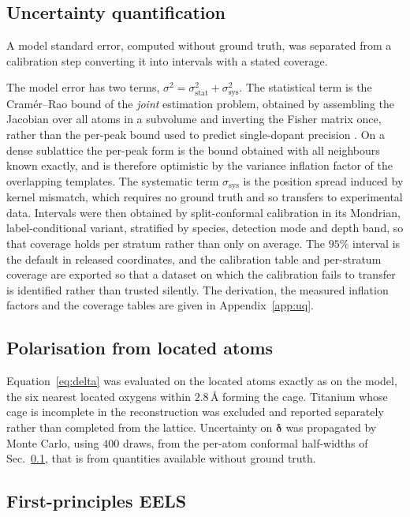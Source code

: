 \documentclass[aps,prb,twocolumn,superscriptaddress,floatfix,nofootinbib]{revtex4-2}
\begin{document}
\subsection{Uncertainty quantification}
\label{sec:uq}

A model standard error, computed without ground truth, was separated from a calibration step
converting it into intervals with a stated coverage.

The model error has two terms, $\sigma^2=\sigma^2_{\mathrm{stat}}+\sigma^2_{\mathrm{sys}}$. The
statistical term is the Cram\'er--Rao bound of the \emph{joint} estimation problem, obtained by
assembling the Jacobian over all atoms in a subvolume and inverting the Fisher matrix once,
rather than the per-peak bound used to predict single-dopant precision
\citep{Chen2021}. On a dense sublattice the per-peak form is the bound obtained
with all neighbours known exactly, and is therefore optimistic by the variance inflation factor
of the overlapping templates. The systematic term $\sigma_{\mathrm{sys}}$ is the position spread
induced by kernel mismatch, which requires no ground truth and so transfers to experimental
data. Intervals were then obtained by split-conformal calibration
\citep{Vovk2005} in its Mondrian, label-conditional variant, stratified by species, detection
mode and depth band, so that coverage holds per stratum rather than only on average. The $95\%$ interval is the default in released
coordinates, and the calibration table and per-stratum coverage are exported so that a dataset
on which the calibration fails to transfer is identified rather than trusted silently. The
derivation, the measured inflation factors and the coverage tables are given in
Appendix~\ref{app:uq}.

\subsection{Polarisation from located atoms}

Equation~\eqref{eq:delta} was evaluated on the located atoms exactly as on the model, the six
nearest located oxygens within $2.8$\,\AA{} forming the cage. Titanium whose cage is incomplete
in the reconstruction was excluded and reported separately rather than completed from the
lattice. Uncertainty on $\boldsymbol{\delta}$ was propagated by Monte Carlo, using $400$ draws,
from the per-atom conformal half-widths of Sec.~\ref{sec:uq}, that is from quantities available
without ground truth.

\subsection{First-principles EELS}
\label{sec:eels-method}
\end{document}
